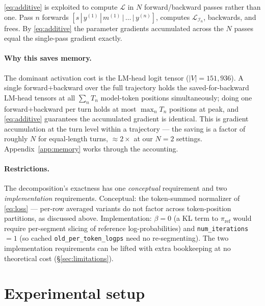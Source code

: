 \documentclass[11pt,a4paper]{article}
\begin{document}
\eqref{eq:additive} is exploited to compute $\mathcal{L}$ in $N$
forward/backward passes rather than one. Pass $n$ forwards
$[s \,|\, y^{(1)} \,|\, m^{(1)} \,|\, \dots \,|\, y^{(n)}]$,
computes $\mathcal{L}_{\mathcal{I}_n}$, backwards, and frees. By
\eqref{eq:additive} the parameter gradients accumulated across the
$N$ passes equal the single-pass gradient exactly.

\paragraph{Why this saves memory.} The dominant activation cost is
the LM-head logit tensor ($|V| = 151{,}936$). A single
forward+backward over the full trajectory holds the saved-for-backward
LM-head tensors at all $\sum_n T_n$ model-token positions
simultaneously; doing one forward+backward per turn holds at most
$\max_n T_n$ positions at peak, and \eqref{eq:additive} guarantees
the accumulated gradient is identical. This is gradient accumulation
at the turn level within a trajectory --- the saving is a factor of
roughly $N$ for equal-length turns, $\approx 2\times$ at our $N{=}2$
settings. Appendix~\ref{app:memory} works through the accounting.

\paragraph{Restrictions.} The decomposition's exactness has one
\emph{conceptual} requirement and two \emph{implementation}
requirements. Conceptual: the token-summed normalizer of
\eqref{eq:loss} --- per-row averaged variants do not factor across
token-position partitions, as discussed above. Implementation:
$\beta=0$ (a KL term to $\pi_{\text{ref}}$ would require per-segment
slicing of reference log-probabilities) and
\texttt{num\_iterations}$=1$ (so cached
\texttt{old\_per\_token\_logps} need no re-segmenting). The two
implementation requirements can be lifted with extra bookkeeping at
no theoretical cost (\S\ref{sec:limitations}).

\section{Experimental setup}
\end{document}

